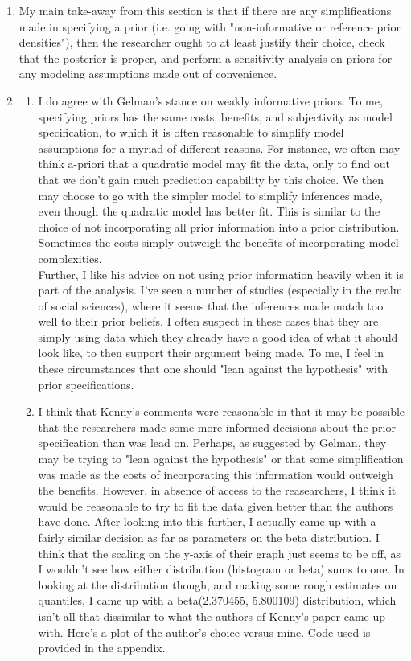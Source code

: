 \documentclass[12pt]{article}\usepackage[]{graphicx}\usepackage[]{color}
\begin{document}
\begin{enumerate}
\item My main take-away from this section is that if there are any simplifications made in specifying a prior (i.e. going with "non-informative or reference prior densities"), then the researcher ought to at least justify their choice, check that the posterior is proper, and perform a sensitivity analysis on priors for any modeling assumptions made out of convenience.

\item 
\begin{enumerate}[label = (\alph*)]
\item I do agree with Gelman's stance on weakly informative priors. To me, specifying priors has the same costs, benefits, and subjectivity as model specification, to which it is often reasonable to simplify model assumptions for a myriad of different reasons. For instance, we often may think a-priori that a quadratic model may fit the data, only to find out that we don't gain much prediction capability by this choice. We then may choose to go with the simpler model to simplify inferences made, even though the quadratic model has better fit. This is similar to the choice of not incorporating all prior information into a prior distribution. Sometimes the costs simply outweigh the benefits of incorporating model complexities.\\

Further, I like his advice on not using prior information heavily when it is part of the analysis. I've seen a number of studies (especially in the realm of social sciences), where it seems that the inferences made match too well to their prior beliefs. I often suspect in these cases that they are simply using data which they already have a good idea of what it should look like, to then support their argument being made. To me, I feel in these circumstances that one should "lean against the hypothesis" with prior specifications.

\item I think that Kenny's comments were reasonable in that it may be possible that the researchers made some more informed decisions about the prior specification than was lead on. Perhaps, as suggested by Gelman, they may be trying to "lean against the hypothesis" or that some simplification was made as the costs of incorporating this information would outweigh the benefits. However, in absence of access to the reasearchers, I think it would be reasonable to try to fit the data given better than the authors have done. After looking into this further, I actually came up with a fairly similar decision as far as parameters on the beta distribution. I think that the scaling on the y-axis of their graph just seems to be off, as I wouldn't see how either distribution (histogram or beta) sums to one. In looking at the distribution though, and making some rough estimates on quantiles, I came up with a beta(2.370455, 5.800109) distribution, which isn't all that dissimilar to what the authors of Kenny's paper came up with. Here's a plot of the author's choice versus mine. Code used is provided in the appendix.


\end{enumerate}
\end{enumerate}
\end{document}
